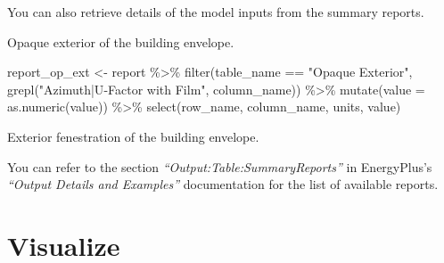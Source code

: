 \documentclass[
]{book}
\newenvironment{Shaded}{\begin{snugshade}}{\end{snugshade}}
\newcommand{\AttributeTok}[1]{\textcolor[rgb]{0.77,0.63,0.00}{#1}}
\newcommand{\ConstantTok}[1]{\textcolor[rgb]{0.00,0.00,0.00}{#1}}
\newcommand{\DecValTok}[1]{\textcolor[rgb]{0.00,0.00,0.81}{#1}}
\newcommand{\DocumentationTok}[1]{\textcolor[rgb]{0.56,0.35,0.01}{\textbf{\textit{#1}}}}
\newcommand{\FunctionTok}[1]{\textcolor[rgb]{0.00,0.00,0.00}{#1}}
\newcommand{\NormalTok}[1]{#1}
\newcommand{\OtherTok}[1]{\textcolor[rgb]{0.56,0.35,0.01}{#1}}
\newcommand{\SpecialCharTok}[1]{\textcolor[rgb]{0.00,0.00,0.00}{#1}}
\newcommand{\StringTok}[1]{\textcolor[rgb]{0.31,0.60,0.02}{#1}}
\begin{document}
You can also retrieve details of the model inputs from the summary reports.

Opaque exterior of the building envelope.

\begin{Shaded}
\begin{Highlighting}[]
\NormalTok{report\_op\_ext }\OtherTok{\textless{}{-}}\NormalTok{ report }\SpecialCharTok{\%\textgreater{}\%}
    \FunctionTok{filter}\NormalTok{(table\_name }\SpecialCharTok{==} \StringTok{"Opaque Exterior"}\NormalTok{,}
           \FunctionTok{grepl}\NormalTok{(}\StringTok{"Azimuth|U{-}Factor with Film"}\NormalTok{, column\_name)) }\SpecialCharTok{\%\textgreater{}\%}
    \FunctionTok{mutate}\NormalTok{(}\AttributeTok{value =} \FunctionTok{as.numeric}\NormalTok{(value)) }\SpecialCharTok{\%\textgreater{}\%}
    \FunctionTok{select}\NormalTok{(row\_name, column\_name, units, value) }
\end{Highlighting}
\end{Shaded}

Exterior fenestration of the building envelope.

\begin{Shaded}
\end{Shaded}

You can refer to the section \emph{``Output:Table:SummaryReports''} in EnergyPlus's \emph{``Output Details and Examples''} documentation for the list of available reports.

\hypertarget{visualize}{%
\chapter{Visualize}\label{visualize}}
\end{document}

